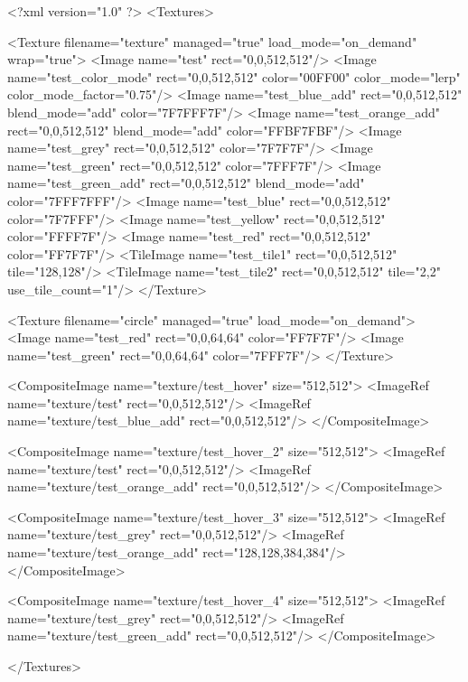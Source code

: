 <?xml version="1.0" ?>
<Textures>

	<Texture filename="texture" managed="true" load_mode="on_demand" wrap="true">
		<Image name="test" rect="0,0,512,512"/>
		<Image name="test_color_mode" rect="0,0,512,512" color="00FF00" color_mode="lerp" color_mode_factor="0.75"/>
		<Image name="test_blue_add" rect="0,0,512,512" blend_mode="add" color="7F7FFF7F"/>
		<Image name="test_orange_add" rect="0,0,512,512" blend_mode="add" color="FFBF7FBF"/>
		<Image name="test_grey" rect="0,0,512,512" color="7F7F7F"/>
		<Image name="test_green" rect="0,0,512,512" color="7FFF7F"/>
		<Image name="test_green_add" rect="0,0,512,512" blend_mode="add" color="7FFF7FFF"/>
		<Image name="test_blue" rect="0,0,512,512" color="7F7FFF"/>
		<Image name="test_yellow" rect="0,0,512,512" color="FFFF7F"/>
		<Image name="test_red" rect="0,0,512,512" color="FF7F7F"/>
		<TileImage name="test_tile1" rect="0,0,512,512" tile="128,128"/>
		<TileImage name="test_tile2" rect="0,0,512,512" tile="2,2" use_tile_count="1"/>
	</Texture>
	
	<Texture filename="circle" managed="true" load_mode="on_demand">
		<Image name="test_red" rect="0,0,64,64" color="FF7F7F"/>
		<Image name="test_green" rect="0,0,64,64" color="7FFF7F"/>
	</Texture>
	
	<CompositeImage name="texture/test_hover" size="512,512">
		<ImageRef name="texture/test" rect="0,0,512,512"/>
		<ImageRef name="texture/test_blue_add" rect="0,0,512,512"/>
	</CompositeImage>
	
	<CompositeImage name="texture/test_hover_2" size="512,512">
		<ImageRef name="texture/test" rect="0,0,512,512"/>
		<ImageRef name="texture/test_orange_add" rect="0,0,512,512"/>
	</CompositeImage>
	
	<CompositeImage name="texture/test_hover_3" size="512,512">
		<ImageRef name="texture/test_grey" rect="0,0,512,512"/>
		<ImageRef name="texture/test_orange_add" rect="128,128,384,384"/>
	</CompositeImage>
	
	<CompositeImage name="texture/test_hover_4" size="512,512">
		<ImageRef name="texture/test_grey" rect="0,0,512,512"/>
		<ImageRef name="texture/test_green_add" rect="0,0,512,512"/>
	</CompositeImage>
	
</Textures>
